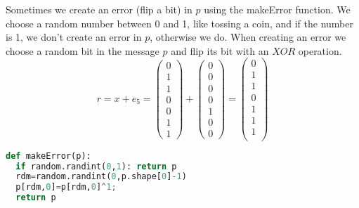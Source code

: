 \documentclass[12pt]{article}
\begin{document}
\newpage
\noindent Sometimes we create an error (flip a bit) in $p$ using the makeError function. We choose a random number between 0 and 1, like tossing a coin, and if the number is 1, we don't create an error in $p$, otherwise we do. When creating an error we choose a random bit in the message $p$ and flip its bit with an $XOR$ operation.
\[
r = x + e_5 = 
\begin{pmatrix}
  0 \\
  1 \\
  1 \\
  0 \\
  0 \\
  1 \\
  1 
\end{pmatrix} 
+
\begin{pmatrix}
  0 \\
  0 \\
  0 \\
  0 \\
  1 \\
  0 \\
  0 
\end{pmatrix} 
=
\begin{pmatrix}
  0 \\
  1 \\
  1 \\
  0 \\
  1 \\
  1 \\
  1 \\
\end{pmatrix} 
\]

\begin{lstlisting}[frame=single,language=Python,caption=makeError \label{code:makeMessage}]
def makeError(p): 
  if random.randint(0,1): return p
  rdm=random.randint(0,p.shape[0]-1)
  p[rdm,0]=p[rdm,0]^1;
  return p
\end{lstlisting}
\end{document}
